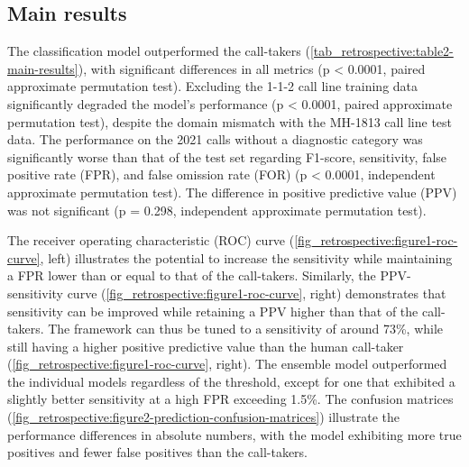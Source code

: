 {\begin{table}[t]
{\begin{tabular}{l|ccccc}
        \bottomrule
    \end{tabular}%
    }
\end{table}

\subsection{Main results}

The classification model outperformed the call-takers (\cref{tab_retrospective:table2-main-results}), with significant differences in all metrics (p < 0.0001, paired approximate permutation test). Excluding the 1-1-2 call line training data significantly degraded the model's performance (p < 0.0001, paired approximate permutation test), despite the domain mismatch with the MH-1813 call line test data. The performance on the 2021 calls without a diagnostic category was significantly worse than that of the test set regarding F1-score, sensitivity, false positive rate (FPR), and false omission rate (FOR) (p < 0.0001, independent approximate permutation test). The difference in positive predictive value (PPV) was not significant (p = 0.298, independent approximate permutation test).

The receiver operating characteristic (ROC) curve (\cref{fig_retrospective:figure1-roc-curve}, left) illustrates the potential to increase the sensitivity while maintaining a FPR lower than or equal to that of the call-takers. Similarly, the PPV-sensitivity curve (\cref{fig_retrospective:figure1-roc-curve}, right) demonstrates that sensitivity can be improved while retaining a PPV higher than that of the call-takers. The framework can thus be tuned to a sensitivity of around 73\%, while still having a higher positive predictive value than the human call-taker (\cref{fig_retrospective:figure1-roc-curve}, right). The ensemble model outperformed the individual models regardless of the threshold, except for one that exhibited a slightly better sensitivity at a high FPR exceeding 1.5\%. The confusion matrices (\cref{fig_retrospective:figure2-prediction-confusion-matrices}) illustrate the performance differences in absolute numbers, with the model exhibiting more true positives and fewer false positives than the call-takers.

}
